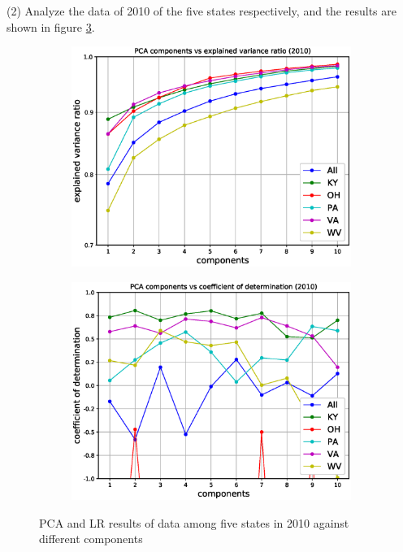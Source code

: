 \documentclass{mcmthesis}
\begin{document}
(2) Analyze the data of 2010 of the five states respectively, and the results are shown in figure \ref{fig:pca_state_2010}. 
    \begin{figure}[H]
    \centering
    \begin{subfigure}[b]{0.49\textwidth}
        \includegraphics[width=\textwidth]{../figure/pca_state_2010_ratio.eps}
        \label{fig:pca_state_2010_ratio}
    \end{subfigure}
    \begin{subfigure}[b]{0.49\textwidth}
        \includegraphics[width=\textwidth]{../figure/pca_state_2010_score.eps}
        \label{fig:pca_state_2010_score}
    \end{subfigure}
    \caption{PCA and LR results of data among five states in 2010 against different components}\label{fig:pca_state_2010}
\end{figure}
\end{document}
